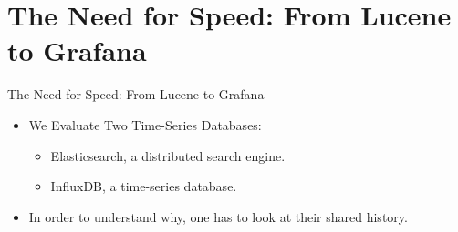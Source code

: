 \documentclass[compress,aspectratio=169]{beamer}
\begin{document}
\section[Overview]{The Need for Speed: From Lucene to Grafana}
\begin{frame}{The Need for Speed: From Lucene to Grafana}
  \begin{itemize}
    \item We Evaluate Two Time-Series Databases:
    \begin{itemize}
      \item Elasticsearch, a distributed search engine.
      \item InfluxDB, a time-series database.
    \end{itemize}
  \item In order to understand why, one has to look at their shared history.
  \end{itemize}
\end{frame}
\end{document}
